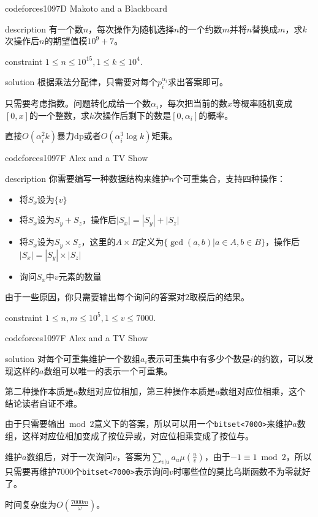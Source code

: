 \documentclass{beamer}
\begin{document}
\begin{frame}{codeforces1097D Makoto and a Blackboard}
	\begin{block}{description}
		有一个数$n$，每次操作为随机选择$n$的一个约数$m$并将$n$替换成$m$，求$k$次操作后$n$的期望值模$10^9+7$。
	\end{block}
	\begin{block}{constraint}
		$1 \le n \le 10^{15}, 1 \le k \le 10^4.$
	\end{block}
	\pause
	\begin{block}{solution}
		根据乘法分配律，只需要对每个$p_i^{\alpha_i}$求出答案即可。
		
		只需要考虑指数。问题转化成给一个数$\alpha_i$，每次把当前的数$x$等概率随机变成$[0,x]$的一个整数，求$k$次操作后剩下的数是$[0,\alpha_i]$的概率。
		
		直接$O(\alpha_i^2k)$暴力dp或者$O(\alpha_i^3\log k)$矩乘。
	\end{block}
\end{frame}
\begin{frame}{codeforces1097F Alex and a TV Show}
	\begin{block}{description}
		你需要编写一种数据结构来维护$n$个可重集合，支持四种操作：
		\begin{itemize}
			\item 将$S_x$设为$\{v\}$
			\item 将$S_x$设为$S_y + S_z$，操作后$|S_x|=|S_y|+|S_z|$
			\item 将$S_x$设为$S_y\times S_z$，这里的$A \times B$定义为$\{\gcd(a,b)|a\in A, b\in B\}$，操作后$|S_x|=|S_y|\times|S_z|$
			\item 询问$S_x$中$v$元素的数量
		\end{itemize}
		
		由于一些原因，你只需要输出每个询问的答案对$2$取模后的结果。
	\end{block}
	\begin{block}{constraint}
		$1\le n, m \le 10^5, 1 \le v \le 7000.$
	\end{block}
\end{frame}
\begin{frame}{codeforces1097F Alex and a TV Show}
	\begin{block}{solution}
		对每个可重集维护一个数组$a_i$表示可重集中有多少个数是$i$的约数，可以发现这样的$a$数组可以唯一的表示一个可重集。
		
		第二种操作本质是$a$数组对应位相加，第三种操作本质是$a$数组对应位相乘，这个结论读者自证不难。
		
		由于只需要输出$\bmod 2$意义下的答案，所以可以用一个\texttt{bitset<7000>}来维护$a$数组，这样对应位相加变成了按位异或，对应位相乘变成了按位与。
		
		维护$a$数组后，对于一次询问$v$，答案为$\sum_{v|u}a_u\mu(\frac{u}{v})$，由于$-1 \equiv 1 \bmod 2$，所以只需要再维护$7000$个\texttt{bitset<7000>}表示询问$v$时哪些位的莫比乌斯函数不为零就好了。
		
		时间复杂度为$O(\frac{7000m}{\omega})$。
	\end{block}
\end{frame}
\end{document}
